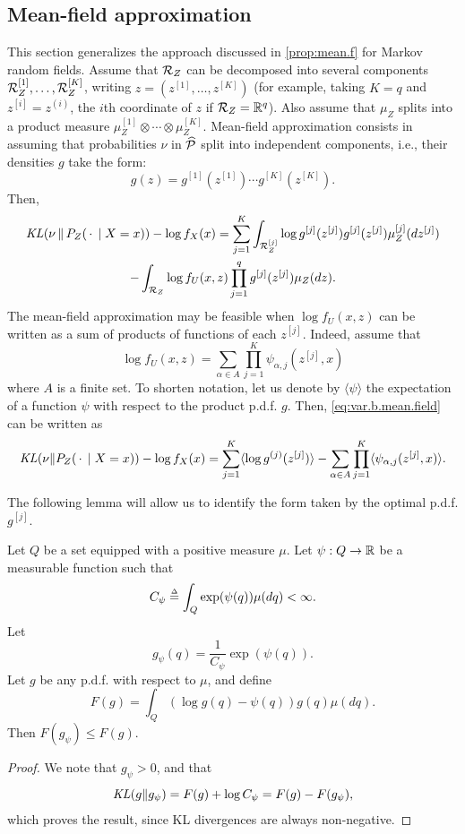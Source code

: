 \subsection{Mean-field approximation}
\label{sec:mean.field}

This section generalizes the approach discussed in \cref{prop:mean.f} for Markov random fields.
Assume that ${\mathcal R}_Z$ can be decomposed into several components ${\mathcal R}_Z^{[1]}, \ldots, {\mathcal R}_Z^{[K]}$, writing $z = (z^{[1]}, \ldots, z^{[K]})$ (for example, taking $K=q$ and $z^{[i]} = z^{(i)}$, the $i$th coordinate of $z$ if ${\mathcal R}_Z= {\mathbb{R}}^q$).  Also assume that $\mu_Z$  splits into a product measure $\mu_Z^{[1]} \otimes\cdots\otimes \mu_Z^{[K]}$. 
Mean-field approximation consists in assuming that probabilities $\nu$ in ${\widehat{\mathcal{P}}}$ split into independent components, i.e.,  their densities $g$ take the form:
\[
g(z) = g^{[1]}(z^{[1]}) \cdots g^{[K]}(z^{[K]}).
\]
Then,
\begin{multline}
\label{eq:var.b.mean.field}
\mathit{KL}(\nu\,\|\,P_Z(\,\cdot\,\mid X=x))  - \log f_X(x) = \sum_{j=1}^K \int_{{\mathcal R}_Z^{[j]}} \log g^{[j]}(z^{[j]}) g^{[j]}(z^{[j]}) \mu_Z^{[j]}(dz^{[j]}) \\
- \int_{{\mathcal R}_Z} \log f_U(x,z) \prod_{j=1}^q g^{[j]}(z^{[j]}) \mu_{Z}(dz).
\end{multline}
The mean-field approximation may be feasible when $\log f_U(x,z)$ can be written as a sum of products of functions of each $z^{[j]}$. Indeed, assume that 
\begin{equation}
\label{eq:mean.field.decomp}
\log f_U(x,z) = \sum_{\alpha\in A} \prod_{j=1}^K \psi_{\alpha,j}(z^{[j]}, x)
\end{equation}
where $A$ is a finite set. To shorten notation, let us denote by $\langle \psi\rangle$ the expectation of a function $\psi$
with respect to the product p.d.f. $g$.
Then, \cref{eq:var.b.mean.field} can be written as
\[
\mathit{KL}(\nu\|P_Z(\,\cdot\,\mid X=x))  - \log f_X(x) = \sum_{j=1}^K \langle \log g^{(j)}(z^{[j]}) \rangle 
- \sum_{\alpha\in A} \prod_{j=1}^K \langle \psi_{\alpha,j}(z^{[j]}, x) \rangle.
\]

The following lemma will allow us to identify the form taken by the optimal p.d.f. $g^{[j]}$. 
\begin{lemma}
\label{lem:max.ent}
Let $Q$ be  a set equipped with a positive measure $\mu$. Let $\psi: Q \to {\mathbb{R}}$ be a measurable function such that 
\[
C_\psi \stackrel{{\scriptscriptstyle \Delta}}{=} \int_Q \exp(\psi(q)) \mu(dq) < \infty.
\]
Let 
\[
g_\psi(q) = \frac{1}{C_\psi} \exp(\psi(q)).
\]
Let $g$ be any p.d.f. with respect to $\mu$, and define
\[
F(g) = \int_Q (\log g(q) - \psi(q)) g(q) \mu(dq).
\]
Then $F(g_\psi) \leq F(g)$. 
\end{lemma}
\begin{proof}
We note that $g_\psi > 0$, and that 
\[
\mathit{KL}(g\|g_\psi) = F(g) + \log C_\psi = F(g) - F(g_\psi),
\]
which proves the result, since KL divergences are always non-negative.
\end{proof}

